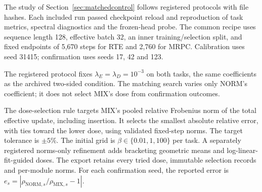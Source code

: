\documentclass{article}
\begin{document}
The study of Section~\ref{sec:matchedcontrol} follows registered protocols with file hashes. Each included run passed checkpoint reload and reproduction of task metrics, spectral diagnostics and the frozen-head probe. The common recipe uses sequence length 128, effective batch 32, an inner training/selection split, and fixed endpoints of 5{,}670 steps for RTE and 2{,}760 for MRPC. Calibration uses seed 31415; confirmation uses seeds 17, 42 and 123.

The registered protocol fixes $\lambda_E=\lambda_D=10^{-3}$ on both tasks, the same coefficients as the archived two-sided condition. The matching search varies only NORM's coefficient; it does not select MIX's dose from confirmation outcomes.

The dose-selection rule targets MIX's pooled relative Frobenius norm of the total effective update, including insertion. It selects the smallest absolute relative error, with ties toward the lower dose, using validated fixed-step norms. The target tolerance is $\pm5\%$. The initial grid is $\beta\in\{0.01,1,100\}$ per task. A separately registered norms-only refinement adds bracketing geometric means and log-linear-fit-guided doses. The export retains every tried dose, immutable selection records and per-module norms. For each confirmation seed, the reported error is $e_s=|\rho_{\mathrm{NORM},s}/\rho_{\mathrm{MIX},s}-1|$.
\end{document}
